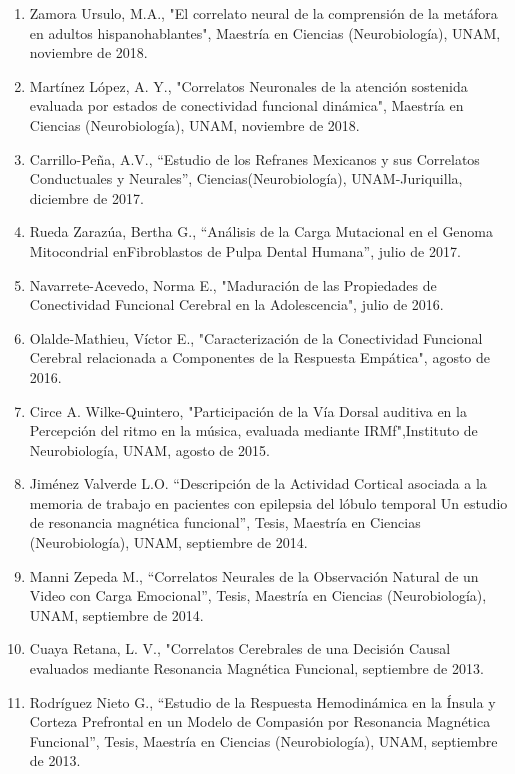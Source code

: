 \begin{enumerate}
\item Zamora Ursulo, M.A., "El correlato neural de la comprensión de la metáfora en adultos hispanohablantes", Maestría en 
Ciencias (Neurobiología), UNAM, noviembre de 2018.

\item Martínez López, A. Y., "Correlatos Neuronales de la atención sostenida evaluada por estados de conectividad funcional 
dinámica", Maestría en Ciencias (Neurobiología), UNAM, noviembre de 2018.

\item Carrillo-Peña, A.V., “Estudio de los Refranes Mexicanos y sus Correlatos Conductuales y Neurales”, 
Ciencias(Neurobiología), UNAM-Juriquilla, diciembre de 2017.

\item Rueda Zarazúa, Bertha G., “Análisis de la Carga Mutacional en el Genoma Mitocondrial enFibroblastos de Pulpa Dental 
Humana”, julio de 2017.

\item Navarrete-Acevedo, Norma E., "Maduración de las Propiedades de Conectividad Funcional Cerebral en la Adolescencia", 
julio de 2016.

\item Olalde-Mathieu, Víctor E., "Caracterización de la Conectividad Funcional Cerebral relacionada a Componentes de la 
Respuesta Empática", agosto de 2016.

\item Circe A. Wilke-Quintero, "Participación de la Vía Dorsal auditiva en la Percepción del ritmo en la música, evaluada 
mediante IRMf",Instituto de Neurobiología, UNAM, agosto de 2015.

\item Jiménez Valverde L.O. “Descripción de la Actividad Cortical asociada a la memoria de trabajo en pacientes con epilepsia 
del lóbulo temporal Un estudio de resonancia magnética funcional”, Tesis, Maestría en Ciencias (Neurobiología), UNAM, 
septiembre de 2014.

\item Manni Zepeda M., “Correlatos Neurales de la Observación Natural de un Video con Carga Emocional”, Tesis, Maestría en 
Ciencias (Neurobiología), UNAM, septiembre de 2014.

\item Cuaya Retana, L. V., "Correlatos Cerebrales de una Decisión Causal evaluados mediante Resonancia Magnética Funcional, 
septiembre de 2013.

\item Rodríguez Nieto G., “Estudio de la Respuesta Hemodinámica en la Ínsula y Corteza Prefrontal en un Modelo de Compasión 
por 
Resonancia Magnética Funcional”, Tesis, Maestría en Ciencias (Neurobiología), UNAM, septiembre 
de 2013.


\end{enumerate}

